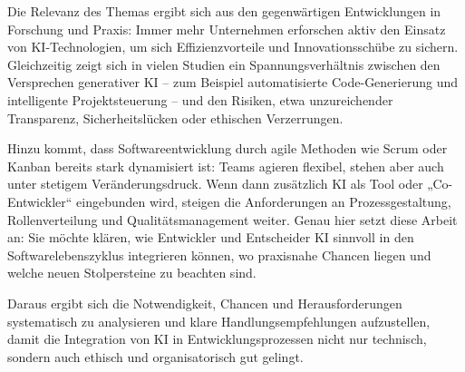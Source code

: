 Die Relevanz des Themas ergibt sich aus den gegenwärtigen Entwicklungen in Forschung und Praxis: Immer mehr Unternehmen erforschen aktiv den Einsatz von KI-Technologien, um sich Effizienzvorteile und Innovationsschübe zu sichern. Gleichzeitig zeigt sich in vielen Studien ein Spannungsverhältnis zwischen den Versprechen generativer KI – zum Beispiel automatisierte Code-Generierung und intelligente Projektsteuerung – und den Risiken, etwa unzureichender Transparenz, Sicherheitslücken oder ethischen Verzerrungen.

Hinzu kommt, dass Softwareentwicklung durch agile Methoden wie Scrum oder Kanban bereits stark dynamisiert ist: Teams agieren flexibel, stehen aber auch unter stetigem Veränderungsdruck. Wenn dann zusätzlich KI als Tool oder „Co-Entwickler“ eingebunden wird, steigen die Anforderungen an Prozessgestaltung, Rollenverteilung und Qualitätsmanagement weiter. Genau hier setzt diese Arbeit an: Sie möchte klären, wie Entwickler und Entscheider KI sinnvoll in den Softwarelebenszyklus integrieren können, wo praxisnahe Chancen liegen und welche neuen Stolpersteine zu beachten sind.

Daraus ergibt sich die Notwendigkeit, Chancen und Herausforderungen systematisch zu analysieren und klare Handlungsempfehlungen aufzustellen, damit die Integration von KI in Entwicklungsprozessen nicht nur technisch, sondern auch ethisch und organisatorisch gut gelingt.